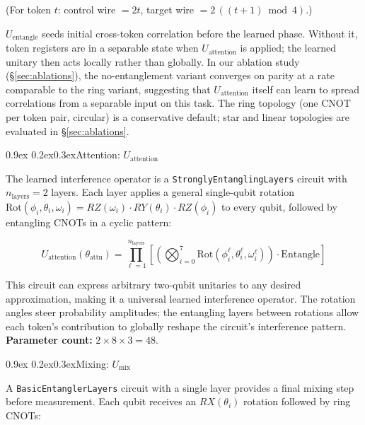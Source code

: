 \documentclass[11pt,a4paper]{article}
\makeatletter
\renewcommand\subsubsection{\@startsection{subsubsection}{3}{\z@}%
  {0.9ex \@plus 0.2ex}{0.3ex}{\normalfont\normalsize\bfseries}}
\newcommand{\Uent}{U_{\!\text{entangle}}}
\newcommand{\Uatt}{U_{\!\text{attention}}}
\newcommand{\Umix}{U_{\!\text{mix}}}
\makeatother
\begin{document}
(For token $t$: control wire $= 2t$, target wire $= 2\,((t+1)\bmod 4)$.)

$\Uent$ seeds initial cross-token correlation before the learned phase. Without it, token
registers are in a separable state when $\Uatt$ is applied; the learned unitary then acts
locally rather than globally. In our ablation study (\S\ref{sec:ablations}), the no-entanglement
variant converges on parity at a rate comparable to the ring variant, suggesting that
$\Uatt$ itself can learn to spread correlations from a separable input on this task.
The ring topology (one CNOT per token pair, circular) is a conservative default;
star and linear topologies are evaluated in \S\ref{sec:ablations}.

\subsubsection{Attention: \texorpdfstring{$\Uatt$}{Uatt}}

The learned interference operator is a \texttt{StronglyEntanglingLayers} circuit with
$n_\text{layers} = 2$ layers. Each layer applies a general single-qubit rotation
$\mathrm{Rot}(\phi_i, \theta_i, \omega_i) = RZ(\omega_i)\cdot RY(\theta_i)\cdot RZ(\phi_i)$
to every qubit, followed by entangling CNOTs in a cyclic pattern:

\begin{equation}
  \Uatt(\theta_\text{attn})
    = \prod_{\ell=1}^{n_\text{layers}}
      \left[
        \left(\bigotimes_{i=0}^{7} \mathrm{Rot}(\phi_i^\ell, \theta_i^\ell, \omega_i^\ell)\right)
        \cdot \mathrm{Entangle}
      \right]
  \label{eq:uatt}
\end{equation}

This circuit can express arbitrary two-qubit unitaries to any desired approximation,
making it a universal learned interference operator. The rotation angles steer
probability amplitudes; the entangling layers between rotations allow each token's
contribution to globally reshape the circuit's interference pattern.
\textbf{Parameter count:} $2 \times 8 \times 3 = 48$.

\subsubsection{Mixing: \texorpdfstring{$\Umix$}{Umix}}

A \texttt{BasicEntanglerLayers} circuit with a single layer provides a final mixing
step before measurement. Each qubit receives an $RX(\theta_i)$ rotation followed by
ring CNOTs:
\end{document}

